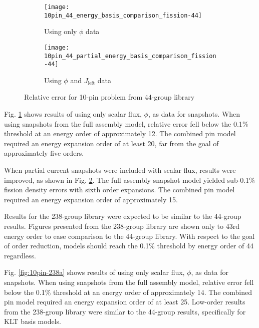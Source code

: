 \documentclass[5p,times,twocolumn,10pt]{elsarticle}
\begin{document}
  \begin{figure*}[!ht]
    \centering
    \begin{subfigure}{0.5\textwidth}
      \centering
      \texttt{[image: 10pin\_44\_energy\_basis\_comparison\_fission-44]}
      \caption{Using only $\phi$ data}
      \label{fig:10pin-44a}
    \end{subfigure}%
    \begin{subfigure}{0.5\textwidth}
      \centering
      \texttt{[image: 10pin\_44\_partial\_energy\_basis\_comparison\_fission-44]}
      \caption{Using $\phi$ and $J_{\text{left}}$ data}
      \label{fig:10pin-44b}
    \end{subfigure}
    \caption{Relative error for 10-pin problem from 44-group library}
    \label{fig:10pin-44}
  \end{figure*}
  
  Fig. \ref{fig:10pin-44a} shows results of using only scalar flux, $\phi$, as data for snapshots.  When using snapshots
  from the full assembly model, relative error fell below the 0.1$\%$ threshold at an energy
  order of approximately 12.  The combined pin model required an energy expansion order of at least 20, far from the goal of approximately five orders.
  
  When partial current snapshots were included with scalar flux, results were improved, as shown in Fig. \ref{fig:10pin-44b}.
  The full assembly snapshot model yielded sub-0.1$\%$ fission density errors with sixth order expansions.  The combined pin model required
  an energy expansion order of approximately 15.
  
  Results for the 238-group library were expected to be similar to the 44-group results.  Figures presented from the 238-group library
  are shown only to 43rd energy order to ease comparison to the 44-group library.  With respect to the goal of order reduction, models should
  reach the 0.1$\%$ threshold by energy order of 44 regardless.
  
  Fig. \ref{fig:10pin-238a} shows results of using only scalar flux, $\phi$, as data for snapshots.  When using snapshots 
  from the full assembly model, relative error fell below the 0.1$\%$ threshold at an energy order of approximately 14.
  The combined pin model required an energy expansion order of at least 25.  Low-order
  results from the 238-group library were similar to the 44-group results, specifically for KLT basis models.
  
\end{document}
